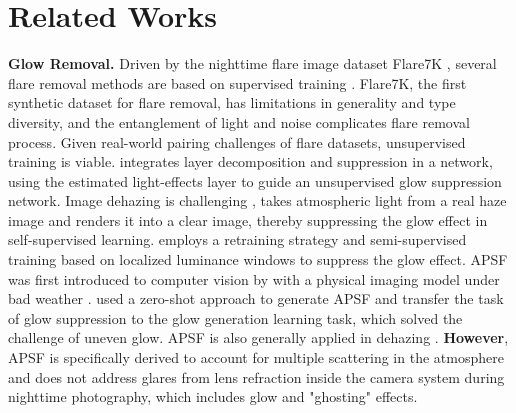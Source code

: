 \section{Related Works}
\noindent\textbf{Glow Removal. }
Driven by the nighttime flare image dataset Flare7K \cite{5}, several flare removal methods are based on supervised training \cite{6,7,15}. Flare7K, the first synthetic dataset for flare removal, has limitations in generality and type diversity, and the entanglement of light and noise \cite{guo2023low} complicates flare removal process. 
Given real-world pairing challenges of flare datasets, unsupervised training is viable.
\cite{11} integrates layer decomposition and suppression in a network, using the estimated light-effects layer to guide an unsupervised glow suppression network. Image dehazing is challenging \cite{wei11}, \cite{lin2024nighthaze} takes atmospheric light from a real haze image and renders it into a clear image, thereby suppressing the glow effect in self-supervised learning. \cite{Cong_2024_CVPR} employs a retraining strategy and semi-supervised training based on localized luminance windows to suppress the glow effect. APSF was first introduced to computer vision by \cite{31} with a physical imaging model under bad weather \cite{li21}. \cite{13,13k} used a zero-shot approach to generate APSF and transfer the task of glow suppression to the glow generation learning task, which solved the challenge of uneven glow. APSF is also generally applied in dehazing \cite{defogging29,zhang2017fast28,2,d3,30,10}. 
\textbf{However}, APSF is specifically derived to account for multiple scattering in the atmosphere and does not address glares from lens refraction inside the camera system during nighttime photography, which includes glow and "ghosting" effects.

